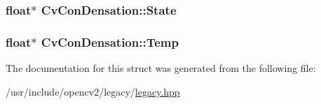 \hypertarget{structCvConDensation_ae20ded637cab2f5d7415914a5c1b1278}{
\subsubsection[{State}]{\setlength{\rightskip}{0pt plus 5cm}float$\ast$ Cv\-Con\-Densation\-::\-State}}\label{structCvConDensation_ae20ded637cab2f5d7415914a5c1b1278}
\hypertarget{structCvConDensation_a5c358b1adb2685490cfb43dec24d51ee}{
\subsubsection[{Temp}]{\setlength{\rightskip}{0pt plus 5cm}float$\ast$ Cv\-Con\-Densation\-::\-Temp}}\label{structCvConDensation_a5c358b1adb2685490cfb43dec24d51ee}


The documentation for this struct was generated from the following file\-:\begin{DoxyCompactItemize}
\item 
/usr/include/opencv2/legacy/\hyperlink{legacy_8hpp}{legacy.\-hpp}\end{DoxyCompactItemize}
